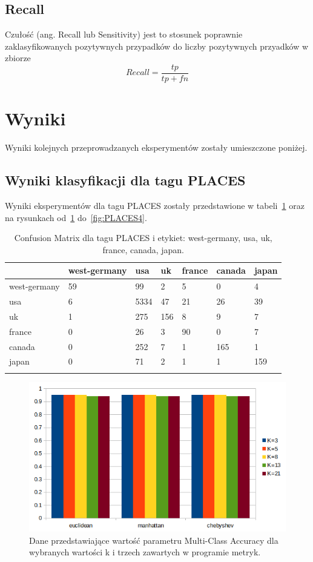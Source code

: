 \documentclass{classrep}
\begin{document}
\subsection{Recall}
Czułość (ang. Recall lub Sensitivity) jest to stosunek poprawnie zaklasyfikowanych pozytywnych przypadków do liczby pozytywnych przyadków w zbiorze
$$ Recall = \frac{tp}{tp+fn} $$

\section{Wyniki}
Wyniki kolejnych przeprowadzanych eksperymentów zostały umieszczone poniżej.
\subsection{Wyniki klasyfikacji dla tagu PLACES}
Wyniki eksperymentów dla tagu PLACES zostały przedstawione w tabeli~\ref{tab:PLACES1} oraz na rysunkach od~\ref{fig:PLACES1} do~\ref{fig:PLACES4}.\\
\begin{table}[H]
\begin{tabular}{|l|l|l|l|l|l|l|}
\hline
             & west-germany & usa  & uk  & france & canada & japan \\ \hline
west-germany & 59           & 99   & 2   & 5      & 0      & 4     \\ \hline
usa          & 6            & 5334 & 47  & 21     & 26     & 39    \\ \hline
uk           & 1            & 275  & 156 & 8      & 9      & 7     \\ \hline
france       & 0            & 26   & 3   & 90     & 0      & 7     \\ \hline
canada       & 0            & 252  & 7   & 1      & 165    & 1     \\ \hline
japan        & 0            & 71   & 2   & 1      & 1      & 159   \\ \hline
\label{tab:PLACES1}
\caption{Confusion Matrix dla tagu PLACES i etykiet: west-germany, usa, uk, france, canada, japan.}
\end{tabular}
\end{table}
\begin{figure}[H]
  \includegraphics[width=\linewidth]{wykresy/1ext5k3mp_mcacc.png}
  \caption{Dane przedstawiające wartość parametru Multi-Class Accuracy dla wybranych wartości k i trzech zawartych w programie metryk.}
  \label{fig:PLACES1}
\end{figure}
\end{document}

